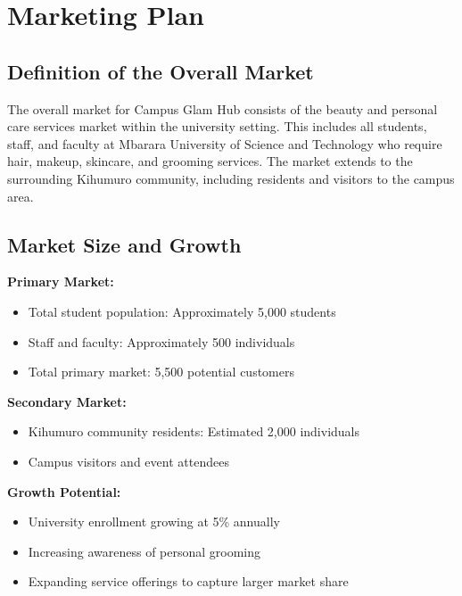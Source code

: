 \section{Marketing Plan}

\subsection{Definition of the Overall Market}

The overall market for Campus Glam Hub consists of the beauty and personal care services market within the university setting. This includes all students, staff, and faculty at Mbarara University of Science and Technology who require hair, makeup, skincare, and grooming services. The market extends to the surrounding Kihumuro community, including residents and visitors to the campus area.

\subsection{Market Size and Growth}

\textbf{Primary Market:}
\begin{itemize}[leftmargin=2em]
    \item Total student population: Approximately 5,000 students
    \item Staff and faculty: Approximately 500 individuals
    \item Total primary market: 5,500 potential customers
\end{itemize}

\textbf{Secondary Market:}
\begin{itemize}[leftmargin=2em]
    \item Kihumuro community residents: Estimated 2,000 individuals
    \item Campus visitors and event attendees
\end{itemize}

\textbf{Growth Potential:}
\begin{itemize}[leftmargin=2em]
    \item University enrollment growing at 5\% annually
    \item Increasing awareness of personal grooming
    \item Expanding service offerings to capture larger market share
\end{itemize}

\vspace{1em}

